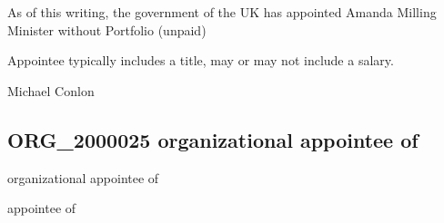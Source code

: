 \documentclass[letterpaper,10pt,english]{sphinxmanual}
\begin{document}
\begin{sphinxShadowBox}

\sphinxAtStartPar
{\hyperref[\detokenize{doc-ORG_2000025::doc}]{}}
\end{sphinxShadowBox}

\begin{sphinxShadowBox}

\sphinxAtStartPar
As of this writing, the government of the UK has appointed Amanda Milling Minister without Portfolio (unpaid)
\end{sphinxShadowBox}

\begin{sphinxShadowBox}

\sphinxAtStartPar
Appointee typically includes a title, may or may not include a salary.
\end{sphinxShadowBox}

\begin{sphinxShadowBox}

\sphinxAtStartPar
Michael Conlon 
\end{sphinxShadowBox}
\begin{quote}

\ignorespaces \end{quote}


\subsection{ORG\_2000025 \sphinxhyphen{} organizational appointee of}
\label{\detokenize{doc-ORG_2000025:org-2000025-organizational-appointee-of}}\label{\detokenize{doc-ORG_2000025:index-0}}\label{\detokenize{doc-ORG_2000025::doc}}
\begin{sphinxShadowBox}

\sphinxAtStartPar
organizational appointee of
\end{sphinxShadowBox}

\begin{sphinxShadowBox}

\sphinxAtStartPar
appointee of
\end{sphinxShadowBox}
\end{document}
